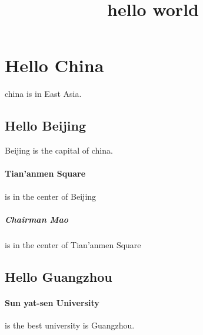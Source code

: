 \documentclass{article}
\title{hello world}
\begin{document}
\maketitle
\section{Hello China} china is in East Asia.
\subsection{Hello Beijing} Beijing is the capital of china.
\paragraph{Tian'anmen Square} is in the center of Beijing
\subparagraph{Chairman Mao} is in the center of Tian'anmen Square
\subsection{Hello Guangzhou}
\paragraph{Sun yat-sen University} is the best university is Guangzhou.
\end{document}
